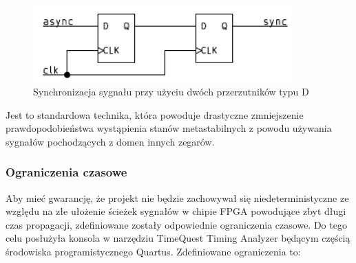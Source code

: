 \begin{figure}[!h]
\centering
\includegraphics[width=100mm,scale=1.5]{2ff.pdf}
\caption{Synchronizacja sygnału przy użyciu dwóch przerzutników typu D}
\end{figure}

Jest to standardowa technika, która powoduje drastyczne zmniejszenie prawdopodobieństwa wystąpienia stanów metastabilnych z powodu używania sygnałów pochodzących z domen innych zegarów.

\subsubsection{Ograniczenia czasowe}
Aby mieć gwarancję, że projekt nie będzie zachowywał się niedeterministyczne ze względu na złe ułożenie ścieżek sygnałów w chipie FPGA powodujące zbyt długi czas propagacji, zdefiniowane zostały odpowiednie ograniczenia czasowe. Do tego celu posłużyła konsola w narzędziu TimeQuest Timing Analyzer będącym częścią środowiska programistycznego Quartus. Zdefiniowane ograniczenia to:

